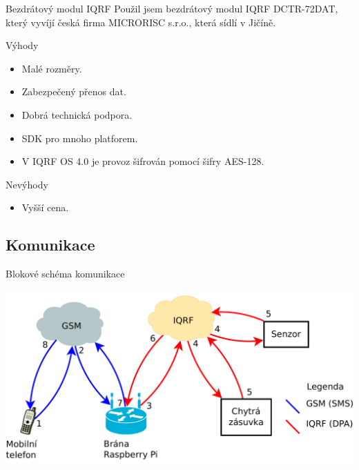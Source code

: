 \documentclass[11pt]{beamer}
\begin{document}
\begin{frame}{Bezdrátový modul IQRF}
  Použil jsem bezdrátový modul IQRF DCTR-72DAT, který vyvíjí česká firma MICRORISC s.r.o., která sídlí v Jičíně.
  \begin{exampleblock}{Výhody}
    \begin{itemize}
      \item Malé rozměry.
      \item Zabezpečený přenos dat.
      \item Dobrá technická podpora.
      \item SDK pro mnoho platforem.
      \item V IQRF OS 4.0 je provoz šifrován pomocí šifry AES-128.
    \end{itemize}
  \end{exampleblock}
  \begin{alertblock}{Nevýhody}
    \begin{itemize}
      \item Vyšší cena.
    \end{itemize}
  \end{alertblock}
\end{frame}

\subsection{Komunikace}

\begin{frame}{Blokové schéma komunikace}
  \begin{center}
    \includegraphics[width = \textwidth]{../img/blokove-schema/komunikace.pdf}
  \end{center}
\end{frame}
\end{document}
